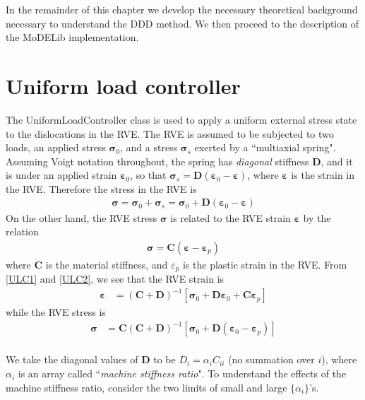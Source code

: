 In the remainder of this chapter we develop the necessary theoretical background necessary to understand the  DDD method. We then proceed to the description of the MoDELib implementation. 

\newpage
\section{Uniform load controller}

The UniformLoadController class is used to apply a uniform external stress state to the dislocations in the RVE.  The RVE is assumed to be subjected to two loads, an applied stress $\bm \sigma_0$, and a stress $\bm \sigma_s$ exerted by a ``multiaxial spring". Assuming Voigt notation throughout, the spring has \emph{diagonal} stiffness $\bm D$, and it is under an applied strain $\bm \varepsilon_0$, so that $\bm \sigma_s=\bm D\left(\bm \varepsilon_0-\bm\varepsilon\right)$, where $\bm\varepsilon$ is the strain in the RVE. 
Therefore the stress in the RVE is
\begin{align}
\bm \sigma=\bm \sigma_0+\bm \sigma_s= \bm \sigma_0+\bm D\left(\bm \varepsilon_0-\bm\varepsilon\right)
\label{ULC1}
\end{align} 
On the other hand, the RVE stress $\bm \sigma$ is  related to the RVE strain $\bm \varepsilon$ by the relation
\begin{align}
\bm \sigma=\bm C\left(\bm \varepsilon-\bm\varepsilon_p\right)
\label{ULC2}
\end{align} 
where $\bm C$ is the material stiffness, and $\varepsilon_p$ is the plastic strain in the RVE. From \eqref{ULC1} and \eqref{ULC2}, we see that the RVE strain is
\begin{align}
\bm \varepsilon&=\left(\bm C+\bm D\right)^{-1} \left[\bm \sigma_0+\bm D\bm \varepsilon_0+\bm C\bm\varepsilon_p\right]
\end{align}
while the RVE stress is
\begin{align}
\bm \sigma&=\bm C\left(\bm C+\bm D\right)^{-1} \left[\bm \sigma_0+\bm D\left(\bm \varepsilon_0- \bm\varepsilon_p\right)\right]\nonumber\\
\end{align}

We take the diagonal values of $\bm D$ to be $D_i=\alpha_i C_{ii}$ (no summation over $i$), where $\alpha_i$ is an array called ``\emph{machine stiffness ratio}". To understand the effects of the machine stiffness ratio, consider the two limits of small and large $\{\alpha_i\}$'s.

